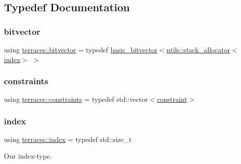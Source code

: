 \subsection{Typedef Documentation}
\mbox{\label{namespaceterraces_a1b526fb554dff829f7ad51eb21d5ed06}} 
\subsubsection{\texorpdfstring{bitvector}{bitvector}}
{\footnotesize\ttfamily using \hyperlink{namespaceterraces_a1b526fb554dff829f7ad51eb21d5ed06}{terraces\+::bitvector} = typedef \hyperlink{classterraces_1_1basic__bitvector}{basic\+\_\+bitvector}$<$\hyperlink{classterraces_1_1utils_1_1stack__allocator}{utils\+::stack\+\_\+allocator}$<$\hyperlink{namespaceterraces_adbc33ccb543d1634e96d0eb02e472c77}{index}$>$ $>$}

\mbox{\label{namespaceterraces_a6f603ffd30ed4d902fce6424492e0581}} 
\subsubsection{\texorpdfstring{constraints}{constraints}}
{\footnotesize\ttfamily using \hyperlink{namespaceterraces_a6f603ffd30ed4d902fce6424492e0581}{terraces\+::constraints} = typedef std\+::vector$<$\hyperlink{structterraces_1_1constraint}{constraint}$>$}

\mbox{\label{namespaceterraces_adbc33ccb543d1634e96d0eb02e472c77}} 
\subsubsection{\texorpdfstring{index}{index}}
{\footnotesize\ttfamily using \hyperlink{namespaceterraces_adbc33ccb543d1634e96d0eb02e472c77}{terraces\+::index} = typedef std\+::size\+\_\+t}



Our index-\/type. 

\mbox{\label{namespaceterraces_a148f3e895119c2a72d995caae669e40d}} 
